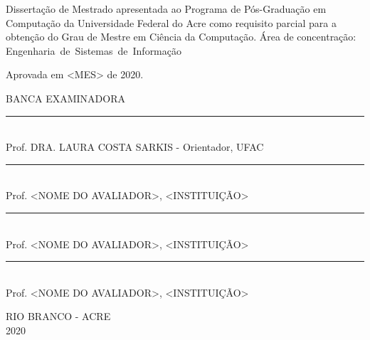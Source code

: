 \noindent
\begin{flushright}
\begin{minipage}[t]{8cm}

Dissertação de Mestrado apresentada ao Programa de P\'{o}s-Gradua\c{c}\~{a}o em Computa\c{c}\~{a}o da Universidade Federal do Acre como requisito parcial para a obten\c{c}\~{a}o do \mbox{Grau} de Mestre em Ciência da Computação. \'{A}rea de concentra\c{c}\~{a}o: \mbox{Engenharia de Sistemas de Informação} %

\end{minipage}
\end{flushright}
\vspace{1.0 cm}
\noindent
Aprovada em <MES> de 2020. \\
\begin{flushright}
  \parbox{11cm}
  {
  \begin{center}
  BANCA EXAMINADORA \\
  \vspace{6mm}
  \rule{11cm}{.1mm} \\
    Prof. DRA. LAURA COSTA SARKIS - Orientador, UFAC \\
    \vspace{6mm}
  \rule{11cm}{.1mm} \\
    Prof. <NOME DO AVALIADOR>, <INSTITUI\c{C}\~AO>\\
    \vspace{6mm}
  \rule{11cm}{.1mm} \\
    Prof. <NOME DO AVALIADOR>, <INSTITUI\c{C}\~AO>\\
  \vspace{4mm}
  \rule{11cm}{.1mm} \\
    Prof. <NOME DO AVALIADOR>, <INSTITUI\c{C}\~AO>\\
    \vspace{6mm}

  \end{center}
  }
\end{flushright}
\begin{center}
  \vspace{4mm}
  RIO BRANCO - ACRE \\
  2020

\end{center}

\cleardoublepage
\thispagestyle{empty}
\vspace*{200mm}

